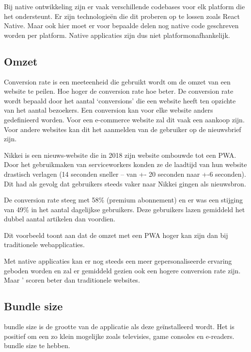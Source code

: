 	Bij native ontwikkeling zijn er vaak verschillende codebases voor elk platform die het ondersteunt. Er zijn technologieën die dit proberen op te lossen zoals React Native. Maar ook hier moet er voor bepaalde delen nog native code geschreven worden per platform. Native applicaties zijn dus niet platformonafhankelijk. 


\subsection{Omzet}
	Conversion rate is een meeteenheid die gebruikt wordt om de omzet van een website te peilen. Hoe hoger de conversion rate hoe beter. De conversion rate wordt bepaald door het aantal ‘conversions’ die een website heeft ten opzichte van het aantal bezoekers. Een conversion kan voor elke website anders gedefinieerd worden. Voor een e-commerce website zal dit vaak een aankoop zijn. Voor andere websites kan dit het aanmelden van de gebruiker op de nieuwsbrief zijn.
	\autocite{GoogleSupport2020}
	
	Nikkei is een nieuws-website die in 2018 zijn website ombouwde tot een PWA.  Door het gebruikmaken van serviceworkers konden ze de laadtijd van hun website drastisch verlagen (14 seconden sneller – van +- 20 seconden naar +-6 seconden). Dit had als gevolg dat gebruikers steeds vaker naar Nikkei gingen als nieuwsbron. 
	
	De conversion rate steeg met 58\% (premium abonnement) en er was een stijging van 49\% in het aantal dagelijkse gebruikers. Deze gebruikers lazen gemiddeld het dubbel aantal artikelen dan voordien. 
	\autocite{Developers2018}
	
	Dit voorbeeld toont aan dat de omzet met een PWA hoger kan zijn dan bij traditionele webapplicaties.
	
	Met native applicaties kan er nog steeds een meer gepersonaliseerde ervaring geboden worden en zal er gemiddeld gezien ook een hogere conversion rate zijn. Maar ' scoren beter dan traditionele websites.
	\autocite{Anastasia2019}
	

\subsection{Bundle size}

	bundle size is de grootte van de applicatie als deze geïnstalleerd wordt. Het is positief om een zo klein mogelijke zoals televisies, game consoles en e-readers.  bundle size te hebben.
	\autocite{Scott2019}
	
